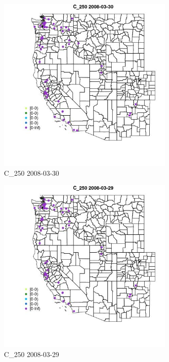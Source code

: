 \begin{figure} 
\centering  
\includegraphics[width=0.77\textwidth]{Code_Outputs/Report_ML_input_PM25_Step4_part_e_de_duplicated_aves_MapObsC_2502008-03-30.jpg} 
\caption{\label{fig:Report_ML_input_PM25_Step4_part_e_de_duplicated_avesMapObsC_2502008-03-30}C_250 2008-03-30} 
\end{figure} 
 

\begin{figure} 
\centering  
\includegraphics[width=0.77\textwidth]{Code_Outputs/Report_ML_input_PM25_Step4_part_e_de_duplicated_aves_MapObsC_2502008-03-29.jpg} 
\caption{\label{fig:Report_ML_input_PM25_Step4_part_e_de_duplicated_avesMapObsC_2502008-03-29}C_250 2008-03-29} 
\end{figure} 
 

